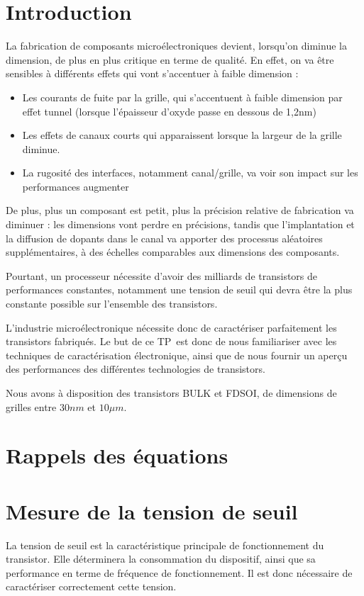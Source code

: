 \documentclass[a4paper,11pt]{report}
\begin{document}


\chapter*{Introduction}
La fabrication de composants microélectroniques devient, lorsqu'on diminue la dimension, de plus en plus critique en terme de qualité. En effet, on va être sensibles à différents effets qui vont s'accentuer à faible dimension :
\begin{itemize}
    \item Les courants de fuite par la grille, qui s'accentuent à faible dimension par effet tunnel (lorsque l'épaisseur d'oxyde passe en dessous de 1,2nm)
    \item Les effets de canaux courts qui apparaissent lorsque la largeur de la grille diminue.
    \item La rugosité des interfaces, notamment canal/grille, va voir son impact sur les performances augmenter
\end{itemize}

De plus, plus un composant est petit, plus la précision relative de fabrication va diminuer : les dimensions vont perdre en précisions, tandis que l'implantation et la diffusion de dopants dans le canal va apporter des processus aléatoires supplémentaires, à des échelles comparables aux dimensions des composants.

Pourtant, un processeur nécessite d'avoir des milliards de transistors de performances constantes, notamment une tension de seuil qui devra être la plus constante possible sur l'ensemble des transistors.

L'industrie microélectronique nécessite donc de caractériser parfaitement les transistors fabriqués. Le but de ce TP est donc de nous familiariser avec les techniques de caractérisation électronique, ainsi que de nous fournir un aperçu des performances des différentes technologies de transistors.

Nous avons à disposition des transistors BULK et FDSOI, de dimensions de grilles entre $30nm$ et $10\mu m$.


\chapter{Rappels des équations}

\chapter{Mesure de la tension de seuil}
La tension de seuil est la caractéristique principale de fonctionnement du transistor. Elle déterminera la consommation du dispositif, ainsi que sa performance en terme de fréquence de fonctionnement. Il est donc nécessaire de caractériser correctement cette tension.
\end{document}
